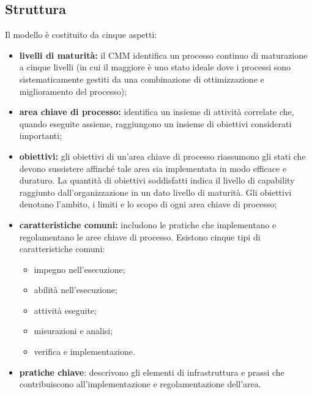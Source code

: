 \subsection{Struttura}
Il modello è costituito da cinque aspetti:
\begin{itemize}
\item  \textbf{livelli di maturità:} il CMM identifica un processo continuo di maturazione a cinque livelli (in cui il maggiore è uno stato ideale dove i processi sono sistematicamente gestiti da una combinazione di ottimizzazione e miglioramento del processo);

\item  \textbf{area chiave di processo:} identifica un insieme di attività correlate che, quando eseguite assieme, raggiungono un insieme di obiettivi considerati importanti;

\item  \textbf{obiettivi:} gli obiettivi di un'area chiave di processo riassumono gli stati che devono sussistere affinché tale area sia implementata in modo efficace e duraturo. La quantità di obiettivi soddisfatti indica il livello di capability raggiunto dall'organizzazione in un dato livello di maturità. Gli obiettivi denotano l’ambito, i limiti e lo scopo di ogni area chiave di processo;

\item  \textbf{caratteristiche comuni:} includono le pratiche che implementano e regolamentano le aree chiave di processo. Esistono cinque tipi di caratteristiche comuni:
\begin{itemize}
	\item impegno nell'esecuzione;
	\item abilità nell'esecuzione;
	\item attività eseguite;
	\item misurazioni e analisi;
	\item verifica e implementazione.
\end{itemize}

\item  \textbf{pratiche chiave}: descrivono gli elementi di infrastruttura e prassi che contribuiscono all'implementazione e regolamentazione dell'area. 
\end{itemize}

